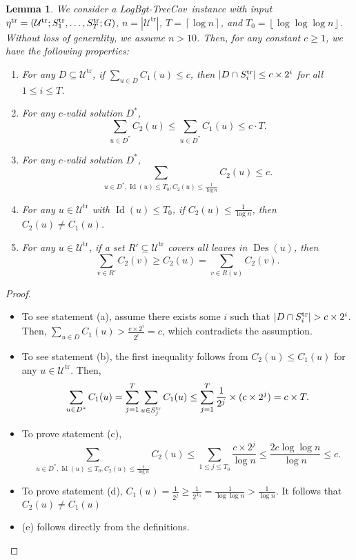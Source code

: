 \documentclass[11pt,a4paper]{article} \usepackage{enumitem}
\newcommand{\floor}[1]{\left\lfloor #1 \right\rfloor}
\newcommand{\ceil}[1]{\left\lceil #1 \right\rceil}
\newcommand{\calU}{\mathcal{U}}
\newcommand{\LBOtreecov}{\textsf{LogBgt-TreeCov}}
\newcommand{\trU}{\operatorname{\calU^{tr}}}
\newcommand{\trS}[1]{\ifx\relax#1\relax
    S^{\operatorname{tr}} \else
    S^{\operatorname{tr}}_{#1} \fi
}
\newcommand{\treta}{\operatorname{\eta^{tr}}}
\newcommand{\Des}{\operatorname{Des}}
\newcommand{\Lev}{\operatorname{Id}}
\newtheorem{lemma}[theorem]{Lemma}
\theoremstyle{definition}
\begin{document}
\begin{lemma}\label{lem:tree-1}
We consider a \LBOtreecov\ instance with input $\treta=(\trU;\trS{1},\ldots,\trS{T};G)$, $n=|\trU|$, $T=\ceil{\log n}$, and $T_0=\floor{\log\log\log n}$. Without loss of generality, we assume $n>10$. Then, for any constant $c\ge 1$, we have the following properties:
\begin{enumerate}[label=(\alph*), format=\normalfont]
\item For any $D\subseteq \trU$, if $\sum_{u\in D} C_1(u)\leq c$, then $|D \cap \trS{i}| \leq c \times 2^i$ for all $1 \leq i \leq T$.

\item For any $c$-valid solution $D^{*}$, $$\sum_{u \in D^*} C_2(u) \leq \sum_{u \in D^*} C_1(u) \leq c \cdot T.$$

\item For any $c$-valid solution $D^{*}$, $$\sum_{u \in D^{*}, \Lev(u)\le T_0, C_2(u) \leq \frac{1}{\log n}} C_2(u) \leq c.$$

\item For any $u\in \trU$ with $\Lev(u)\le T_0$, if $C_2(u) \leq \frac{1}{\log n}$, then $C_2(u) \neq C_1(u)$. 

\item For any $u\in \trU$, if a set $R'\subseteq \trU$ covers all leaves in $\Des(u)$, then 
$$\sum_{v \in R'} C_2(v) \geq C_2(u) = \sum_{v \in R(u)} C_2(v).$$
\end{enumerate}
\end{lemma}
\begin{proof}

\begin{itemize}
\item To see statement (a), assume there exists some $i$ such that $|D \cap \trS{i}| > c \times 2^i$. Then, $\sum_{u \in D} C_1(u) > \frac{c \times 2^i}{2^i} = c$, which contradicts the assumption.

\item To see statement (b), the first inequality follows from $C_2(u) \leq C_1(u)$ for any $u\in \trU$. Then,
$$\sum_{u \in D^*} C_1(u) = \sum_{j = 1}^T \sum_{u \in \trS{j}} C_1(u) \leq \sum_{j = 1}^T \frac{1}{2^j} \times (c \times 2^j) = c \times T.$$

\item To prove statement (c), 
$$\sum_{u \in D^{*}, \Lev(u)\le T_0, C_2(u) \leq \frac{1}{\log n}} C_2(u)\le \sum_{1 \leq j \leq T_0} \frac{c \times 2^j}{\log n} \leq \frac{2c \log\log n}{\log n} \leq c.$$

\item To prove statement (d), $C_1(u) = \frac{1}{2^j} \geq \frac{1}{2^{T_0}} = \frac{1}{\log \log n} > \frac{1}{\log n}$. It follows that $C_2(u) \neq C_1(u)$

\item (e) follows directly from the definitions.
\end{itemize}
\end{proof}
\end{document}
